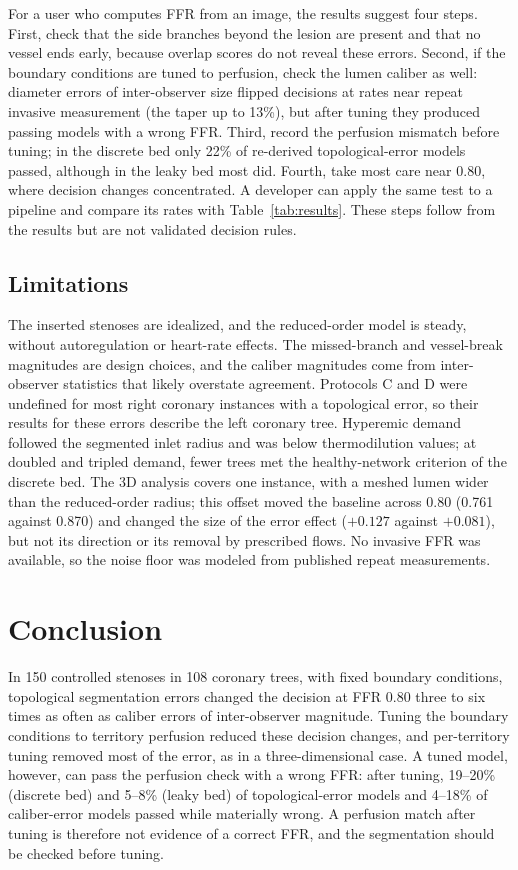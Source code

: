 \documentclass[journal]{IEEEtran}
\begin{document}
For a user who computes FFR from an image, the results suggest four steps. First, check that the side branches
beyond the lesion are present and that no vessel ends early, because overlap scores do not reveal these errors.
Second, if the boundary conditions are tuned to perfusion, check the lumen caliber as well: diameter errors of
inter-observer size flipped decisions at rates near repeat invasive measurement (the taper up to 13\%), but after
tuning they produced passing models with a wrong FFR. Third, record the perfusion mismatch before tuning; in the discrete bed
only 22\% of re-derived topological-error models passed, although in the leaky bed most did. Fourth, take most care near 0.80,
where decision changes concentrated. A developer can apply the same test to a pipeline and compare its rates with Table~\ref{tab:results}.
These steps follow from the results but are not validated decision rules.

\subsection{Limitations}
The inserted stenoses are idealized, and the reduced-order model is steady, without autoregulation or heart-rate
effects. The missed-branch and vessel-break magnitudes are design choices, and the caliber magnitudes come from
inter-observer statistics that likely overstate agreement. Protocols C and D were undefined for most right coronary
instances with a topological error, so their results for these errors describe the left coronary tree. Hyperemic
demand followed the segmented inlet radius and was below thermodilution values; at doubled and tripled demand,
fewer trees met the healthy-network criterion of the discrete bed. The 3D analysis covers one instance, with a
meshed lumen wider than the reduced-order radius; this offset moved the baseline
across 0.80 (0.761 against 0.870) and changed the size of the error effect ($+0.127$ against $+0.081$), but not its
direction or its removal by prescribed flows. No invasive FFR was available, so the noise floor was modeled from published repeat
measurements.

\section{Conclusion}
In 150 controlled stenoses in 108 coronary trees, with fixed boundary conditions, topological segmentation errors
changed the decision at FFR 0.80 three to six times as often as caliber errors of inter-observer magnitude. Tuning the
boundary conditions to territory perfusion reduced these decision changes, and per-territory tuning removed most of
the error, as in a three-dimensional case. A tuned model, however, can pass the perfusion check with a wrong FFR: after tuning,
19--20\% (discrete bed) and 5--8\% (leaky bed) of topological-error models and 4--18\% of caliber-error models passed
while materially wrong. A perfusion match after tuning is therefore not evidence of a correct FFR, and the
segmentation should be checked before tuning.
\end{document}
